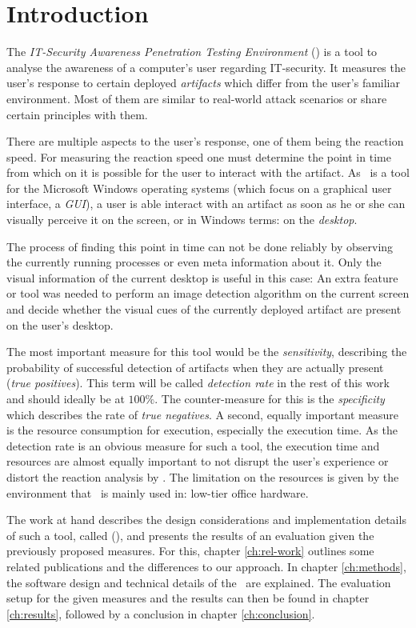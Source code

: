 \chapter{Introduction}\label{ch:intro}

The \emph{IT-Security Awareness Penetration Testing Environment} (\ape)\cite{itsape} is a tool to analyse the awareness of a computer's user regarding IT-security. It measures the user's response to certain deployed \emph{artifacts} which differ from the user's familiar environment. Most of them are similar to real-world attack scenarios or share certain principles with them.

There are multiple aspects to the user's response, one of them being the reaction speed. For measuring the reaction speed one must determine the point in time from which on it is possible for the user to interact with the artifact. As \ape~is a tool for the Microsoft Windows operating systems (which focus on a graphical user interface, a \emph{GUI}), a user is able interact with an artifact as soon as he or she can visually perceive it on the screen, or in Windows terms: on the \emph{desktop}.

The process of finding this point in time can not be done reliably by observing the currently running processes or even meta information about it. Only the visual information of the current desktop is useful in this case: An extra feature or tool was needed to perform an image detection algorithm on the current screen and decide whether the visual cues of the currently deployed artifact are present on the user's desktop.

The most important measure for this tool would be the \emph{sensitivity}, describing the probability of successful detection of artifacts when they are actually present (\emph{true positives}). This term will be called \emph{detection rate} in the rest of this work and should ideally be at $100\%$. The counter-measure for this is the \emph{specificity} which describes the rate of \emph{true negatives}. A second, equally important measure is the resource consumption for execution, especially the execution time. As the detection rate is an obvious measure for such a tool, the execution time and resources are almost equally important to not disrupt the user's experience or distort the reaction analysis by \ape. The limitation on the resources is given by the environment that \ape~is mainly used in: low-tier office hardware.

The work at hand describes the design considerations and implementation details of such a tool, called \emph{\vad} (\emph{\vd}), and presents the results of an evaluation given the previously proposed measures. For this, chapter \ref{ch:rel-work} outlines some related publications and the differences to our approach. In chapter \ref{ch:methods}, the software design and technical details of the \vd~are explained. The evaluation setup for the given measures and the results can then be found in chapter \ref{ch:results}, followed by a conclusion in chapter \ref{ch:conclusion}.

